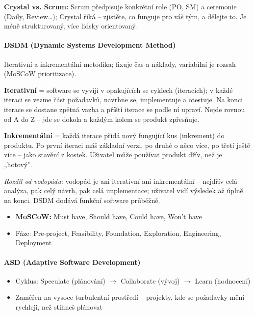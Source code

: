 \textbf{Crystal vs. Scrum:} Scrum předpisuje konkrétní role (PO, SM) a ceremonie (Daily, Review\ldots); Crystal říká -- zjistěte, co funguje pro váš tým, a dělejte to. Je méně strukturovaný, více lidsky orientovaný.

\paragraph{DSDM (Dynamic Systems Development Method)}
Iterativní a inkrementální metodika; fixuje čas a náklady, variabilní je rozsah (MoSCoW prioritizace).

\textbf{Iterativní} = software se vyvíjí v opakujících se cyklech (iteracích); v každé iteraci se vezme část požadavků, navrhne se, implementuje a otestuje. Na konci iterace se dostane zpětná vazba a příští iterace se podle ní upraví. Nejde rovnou od A do Z -- jde se dokola a každým kolem se produkt zpřesňuje.

\textbf{Inkrementální} = každá iterace přidá nový fungující kus (inkrement) do produktu. Po první iteraci máš základní verzi, po druhé o něco více, po třetí ještě více -- jako stavění z kostek. Uživatel může používat produkt dřív, než je „hotový".

\textit{Rozdíl od vodopádu:} vodopád je ani iterativní ani inkrementální -- nejdřív celá analýza, pak celý návrh, pak celá implementace; uživatel vidí výsledek až úplně na konci. DSDM dodává funkční software průběžně.
\begin{itemize}
  \item \textbf{MoSCoW:} Must have, Should have, Could have, Won't have
  \item Fáze: Pre-project, Feasibility, Foundation, Exploration, Engineering, Deployment
\end{itemize}

\paragraph{ASD (Adaptive Software Development)}
\begin{itemize}
  \item Cyklus: Speculate (plánování) $\to$ Collaborate (vývoj) $\to$ Learn (hodnocení)
  \item Zaměřen na vysoce turbulentní prostředí -- projekty, kde se požadavky mění rychleji, než stihneš plánovat
\end{itemize}

